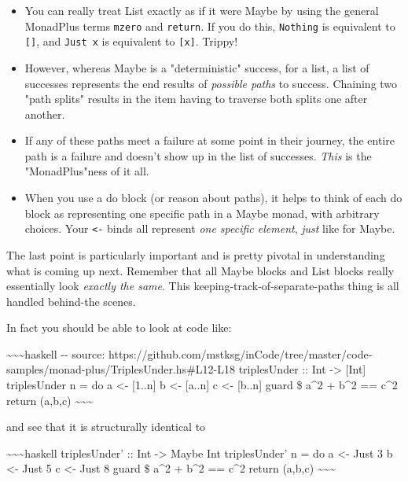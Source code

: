 \documentclass[]{article}
\begin{document}
\begin{itemize}
\tightlist
\item
  You can really treat List exactly as if it were Maybe by using the general
  MonadPlus terms \texttt{mzero} and \texttt{return}. If you do this,
  \texttt{Nothing} is equivalent to \texttt{{[}{]}}, and \texttt{Just\ x} is
  equivalent to \texttt{{[}x{]}}. Trippy!
\item
  However, whereas Maybe is a "deterministic" success, for a list, a list of
  successes represents the end results of \emph{possible paths} to success.
  Chaining two "path splits" results in the item having to traverse both splits
  one after another.
\item
  If any of these paths meet a failure at some point in their journey, the
  entire path is a failure and doesn't show up in the list of successes.
  \emph{This} is the "MonadPlus"ness of it all.
\item
  When you use a do block (or reason about paths), it helps to think of each do
  block as representing one specific path in a Maybe monad, with arbitrary
  choices. Your \texttt{\textless{}-} binds all represent \emph{one specific
  element}, \emph{just} like for Maybe.
\end{itemize}

The last point is particularly important and is pretty pivotal in understanding
what is coming up next. Remember that all Maybe blocks and List blocks really
essentially look \emph{exactly the same}. This keeping-track-of-separate-paths
thing is all handled behind-the scenes.

In fact you should be able to look at code like:

\textasciitilde{}\textasciitilde{}\textasciitilde{}haskell -\/- source:
https://github.com/mstksg/inCode/tree/master/code-samples/monad-plus/TriplesUnder.hs\#L12-L18
triplesUnder :: Int -\textgreater{} {[}Int{]} triplesUnder n = do a \textless{}-
{[}1..n{]} b \textless{}- {[}a..n{]} c \textless{}- {[}b..n{]} guard \$ a\^{}2 +
b\^{}2 == c\^{}2 return (a,b,c)
\textasciitilde{}\textasciitilde{}\textasciitilde{}

and see that it is structurally identical to

\textasciitilde{}\textasciitilde{}\textasciitilde{}haskell triplesUnder' :: Int
-\textgreater{} Maybe Int triplesUnder' n = do a \textless{}- Just 3 b
\textless{}- Just 5 c \textless{}- Just 8 guard \$ a\^{}2 + b\^{}2 == c\^{}2
return (a,b,c) \textasciitilde{}\textasciitilde{}\textasciitilde{}
\end{document}
